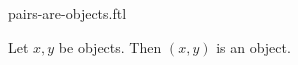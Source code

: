 \documentclass{stex}
\begin{document}
\begin{smodule}{pairs-are-objects.ftl}
  \begin{forthel}
    \begin{lemma}
      Let $x, y$ be objects.
      Then $(x,y)$ is an object.
    \end{lemma}
  \end{forthel}
\end{smodule}
\end{document}
